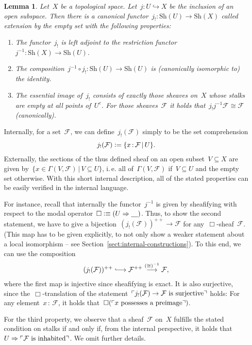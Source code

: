 \documentclass[10pt,reqno,a4paper]{amsbook}
\makeatletter
\theoremstyle{definition}
\theoremstyle{plain}
\newtheorem{lemma}[defn]{Lemma}
\theoremstyle{remark}
\newcommand{\F}{\mathcal{F}}
\newcommand{\placeholder}{\underline{\quad}}
\newcommand{\Sh}{\mathrm{Sh}}
\newcommand{\?}{\,{:}\,}
\renewcommand{\_}{\mathpunct{.}\,}
\newcommand{\speak}[1]{\ulcorner\text{\textnormal{#1}}\urcorner}
\newcommand{\lra}{\longrightarrow}
\newcommand{\lhra}{\ensuremath{\lhook\joinrel\relbar\joinrel\rightarrow}}
\newcommand{\ie}{i.\,e.\@\xspace}
\newcommand{\defeq}{\vcentcolon=}
\newcommand{\defequiv}{\vcentcolon\equiv}
\renewenvironment{proof}[1][\proofname]{\par
  \pushQED{\qed}%
  \normalfont \topsep6\p@\@plus6\p@\relax
  \trivlist
  \item[\hskip\labelsep
        \itshape
    #1\@addpunct{.}]\ignorespaces
}{%
  \popQED\endtrivlist\@endpefalse
}
\makeatother
\begin{document}
\begin{lemma}\label{lemma:extension-by-empty-set}
Let~$X$ be a topological space. Let~$j : U \hookrightarrow X$ be the inclusion
of an open subspace. Then there is a canonical functor~$j_! : \Sh(U) \to
\Sh(X)$ called \emph{extension by the empty set} with the following properties:
\begin{enumerate}
\item The functor~$j_!$ is left adjoint to the restriction functor~$j^{-1} : \Sh(X) \to
\Sh(U)$.
\item The composition~$j^{-1} \circ j_! : \Sh(U) \to \Sh(U)$ is (canonically
isomorphic to) the identity.
\item The essential image of~$j_!$ consists of exactly those sheaves on~$X$
whose stalks are empty at all points of~$U^c$. For those sheaves~$\F$ it holds
that~$j_!j^{-1}\F \cong \F$ (canonically).
\end{enumerate}
\end{lemma}
\begin{proof}Internally, for a set~$\F$, we can define~$j_!(\F)$ simply to be the
set comprehension
\[ j_!(\F) \defeq \{ x\?\F \,|\, U \}. \]
Externally, the sections of the thus defined sheaf on an open subset~$V
\subseteq X$ are given by~$\{ x \in \Gamma(V,\F) \,|\, V \subseteq U \}$,
\ie all of~$\Gamma(V,\F)$ if~$V \subseteq U$ and the empty set otherwise.
With this short internal description, all of the stated properties can be
easily verified in the internal language.

For instance, recall that internally the functor~$j^{-1}$ is given by
sheafifying with respect to the modal operator~$\Box \defequiv (U \Rightarrow
\placeholder)$. Thus, to show the second statement, we have to give a
bijection~$(j_!(\F))^{++} \to \F$ for any~$\Box$-sheaf~$\F$. (This map has to
be given explicitly, to not only show a weaker statement about a local
isomorphism -- see Section~\ref{sect:internal-constructions}). To this end, we can use the composition
\[ (j_!(\F))^{++} \lhra \F^{++} \stackrel{({\cong})^{-1}}{\lra} \F, \]
where the first map is injective since sheafifying is exact. It is also
surjective, since the~$\Box$-translation of the statement~$\speak{$j_!(\F) \to
\F$ is surjective}$ holds: For any element~$x\?\F$, it holds
that~$\Box(\speak{$x$ possesses a preimage})$.

For the third property, we observe that a sheaf~$\F$ on~$X$ fulfills the stated
condition on stalks if and only if, from the internal perspective, it holds
that~$U \Rightarrow \speak{$\F$ is inhabited}$. We omit further details.
\end{proof}
\end{document}
